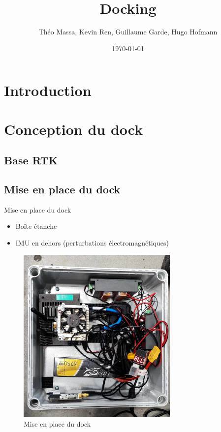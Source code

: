 \documentclass[pdftex,beamer,aspectratio=169]{beamer}
\title[Docking]{Docking}
\author[]{Théo Massa, Kevin Ren, Guillaume Garde, Hugo Hofmann}
\date{\today}
\institute{ENSTA Bretagne}
\theoremstyle{definition}
\theoremstyle{example}
\theoremstyle{plain}
\begin{document}
\frame{\titlepage}

\begin{frame}[allowframebreaks]
  \tableofcontents
\end{frame}

\section{Introduction} 

\section{Conception du dock}

\subsection{Base RTK}

\subsection{Mise en place du dock}

\begin{frame}{Mise en place du dock}
  \begin{minipage}{0.5\textwidth}
    \begin{itemize}
      \item Boîte étanche
      \item IMU en dehors (perturbations électromagnétiques)
    \end{itemize}
  \end{minipage}%
  \begin{minipage}{0.49\textwidth}
    \begin{figure}[H]
      \centering
      \includegraphics[width=0.7\textwidth]{dock_box_inside.jpg}
      \caption{Mise en place du dock}
  \end{figure}
  \end{minipage}
\end{frame}
\end{document}

